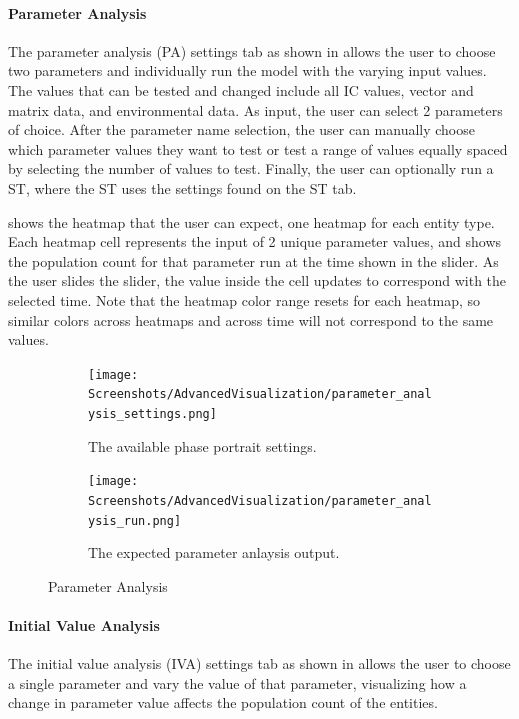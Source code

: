 \paragraph{Parameter Analysis}
\label{sec:parameter_analysis}
The parameter analysis (PA) settings tab as shown in  allows the user to choose two parameters and individually run the model with the varying input values.
The values that can be tested and changed include all IC values, vector and matrix data, and environmental data.
As input, the user can select 2 parameters of choice.
After the parameter name selection, the user can manually choose which parameter values they want to test or test a range of values equally spaced by selecting the number of values to test.
Finally, the user can optionally run a ST, where the ST uses the settings found on the ST tab. 

 shows the heatmap that the user can expect, one heatmap for each entity type.
Each heatmap cell represents the input of 2 unique parameter values, and shows the population count for that parameter run at the time shown in the slider. 
As the user slides the slider, the value inside the cell updates to correspond with the selected time. 
Note that the heatmap color range resets for each heatmap, so similar colors across heatmaps and across time will not correspond to the same values.

\begin{figure}[h!]
    \centering
    \begin{subfigure}{0.49\linewidth}
        \centering
        \captionsetup{width=1\linewidth}
        \texttt{[image: Screenshots/AdvancedVisualization/parameter\_analysis\_settings.png]}
        \caption{
            The available phase portrait settings. 
        }
        \label{fig:ss:av:parameter_analysis_settings}
    \end{subfigure}
    \hfill
    \begin{subfigure}{0.49\linewidth}
        \centering
        \captionsetup{width=1\linewidth}
        \texttt{[image: Screenshots/AdvancedVisualization/parameter\_analysis\_run.png]}
        \caption{
            The expected parameter anlaysis output. 
        }
        \label{fig:ss:av:parameter_analysis_run}
    \end{subfigure}
    \caption{Parameter Analysis}
\end{figure}


\paragraph{Initial Value Analysis}
\label{sec:initial_value_analysis}
The initial value analysis (IVA) settings tab as shown in  allows the user to choose a single parameter and vary the value of that parameter, visualizing how a change in parameter value affects the population count of the entities.

